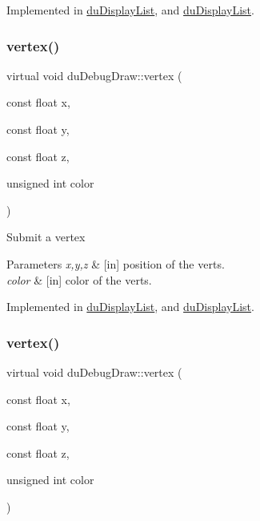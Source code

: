 Implemented in \hyperlink{classduDisplayList_ab4aa562f713485769b68d1989c6e1ec4}{du\+Display\+List}, and \hyperlink{classduDisplayList_a5560d17b5190f75733154af2610ed83f}{du\+Display\+List}.

\mbox{\label{structduDebugDraw_a2af291d6e63081ce1d3f34e1851ae5e0}} 
\subsubsection{\texorpdfstring{vertex()}{vertex()}\hspace{0.1cm}{\footnotesize\ttfamily [3/8]}}
{\footnotesize\ttfamily virtual void du\+Debug\+Draw\+::vertex (\begin{DoxyParamCaption}\item[{const float}]{x,  }\item[{const float}]{y,  }\item[{const float}]{z,  }\item[{unsigned int}]{color }\end{DoxyParamCaption})\hspace{0.3cm}{\ttfamily [pure virtual]}}

Submit a vertex 
\begin{DoxyParams}{Parameters}
{\em x,y,z} & \mbox{[}in\mbox{]} position of the verts. \\
\hline
{\em color} & \mbox{[}in\mbox{]} color of the verts. \\
\hline
\end{DoxyParams}


Implemented in \hyperlink{classduDisplayList_af724f7566b2c1c2c09453dc064c6eecf}{du\+Display\+List}, and \hyperlink{classduDisplayList_aa98c1a7225f0af78674db24c75afe6f3}{du\+Display\+List}.

\mbox{\label{structduDebugDraw_a2af291d6e63081ce1d3f34e1851ae5e0}} 
\subsubsection{\texorpdfstring{vertex()}{vertex()}\hspace{0.1cm}{\footnotesize\ttfamily [4/8]}}
{\footnotesize\ttfamily virtual void du\+Debug\+Draw\+::vertex (\begin{DoxyParamCaption}\item[{const float}]{x,  }\item[{const float}]{y,  }\item[{const float}]{z,  }\item[{unsigned int}]{color }\end{DoxyParamCaption})\hspace{0.3cm}{\ttfamily [pure virtual]}}

